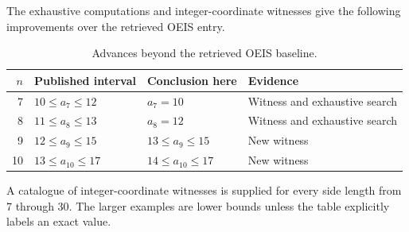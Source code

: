The exhaustive computations and integer-coordinate witnesses give
the following improvements over the retrieved OEIS entry.
\begin{table}[ht]
\centering
\caption{Advances beyond the retrieved OEIS baseline.}
\label{tab:small-results}
\begin{tabular}{rlll}
\toprule
\(n\)&Published interval&Conclusion here&Evidence\\
\midrule
7&\(10\le a_{7}\le12\)&\(a_{7}=10\)&Witness and exhaustive search\\
8&\(11\le a_{8}\le13\)&\(a_{8}=12\)&Witness and exhaustive search\\
9&\(12\le a_{9}\le15\)&\(13\le a_{9}\le15\)&New witness\\
10&\(13\le a_{10}\le17\)&\(14\le a_{10}\le17\)&New witness\\
\bottomrule
\end{tabular}
\end{table}
A catalogue of integer-coordinate witnesses is supplied for every
side length from 7 through 30. The larger examples are lower bounds
unless the table explicitly labels an exact value.
